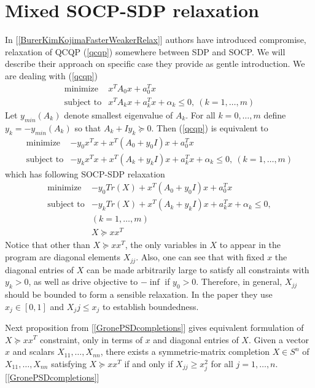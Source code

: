 \documentclass[10pt,oneside]{book}
\theoremstyle{definition}
\begin{document}
\section{Mixed SOCP-SDP relaxation}

In [\ref{BurerKimKojimaFasterWeakerRelax}] authors have introduced compromise, relaxation of QCQP (\ref{qcqp}) somewhere between SDP and SOCP. We will describe their approach on specific case they provide as gentle introduction.
We are dealing with (\ref{qcqp})
\begin{equation}
\begin{array}{ll}
\mbox{minimize}& x^TA_0x + a_0^Tx \\
\mbox{subject to}& x^TA_kx + a_k^Tx + \alpha_k \leq 0, \  (k = 1,\dots ,m)
\end{array} 
\end{equation}
Let  $y_{min}(A_k)$ denote smallest eigenvalue of $A_k$.
For all $k=0,\dots ,m$ define $y_k=-y_{min}(A_k)$ so that $A_k + Iy_k\succeq 0$. Then (\ref{qcqp}) is equivalent to 
\begin{equation*}
\begin{array}{ll}
\mbox{minimize}& -y_0 x^Tx +  x^T(A_0+y_0 I)x + a_0^Tx \\
\mbox{subject to}& -y_kx^Tx +  x^T(A_k+y_kI)x + a_k^Tx + \alpha_k \leq 0, \  (k = 1,\dots ,m)
\end{array} 
\end{equation*}
which has following SOCP-SDP relaxation
\begin{equation}
\label{InBetweenSOCPSDP1}
\begin{array}{ll}
\mbox{minimize}& -y_0 Tr(X) +  x^T(A_0+y_0 I)x + a_0^Tx \\
\mbox{subject to}& -y_k Tr(X) +  x^T(A_k+y_kI)x + a_k^Tx + \alpha_k \leq 0, \\  
&(k = 1,\dots ,m) \\
& X\succeq xx^T
\end{array} 
\end{equation}
Notice that other than $X\succeq xx^T$, the only variables in $X$ to appear in the program are diagonal elements $X_{jj}$.
Also, one can see that with fixed $x$ the diagonal entries of $X$ can be made arbitrarily large to satisfy all constraints with $y_k>0$, as well as drive objective to $-\inf$ if $y_0>0$. Therefore, in general, $X_{jj}$ should be bounded to form a sensible relaxation. In the paper they use $x_j\in [0,1]$ and $X_jj\leq x_j$ to establish boundedness.

Next proposition from [\ref{GronePSDcompletions}] gives equivalent formulation of $X\succeq xx^T$ constraint, only in terms of $x$ and diagonal entries of $X$.
\prop Given a vector $x$ and scalars $X_{11},\dots ,X_{nn}$, there exists
a symmetric-matrix completion $X\in S^n$ of $X_{11},\dots ,X_{nn}$ satisfying $X \succeq xx^T$ if and only if $X_{jj} \geq x^2_j$ for all $j = 1,\dots ,n.$ \rm [\ref{GronePSDcompletions}]
\end{document}
